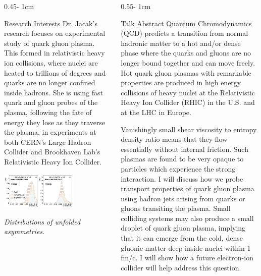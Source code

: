 \documentclass{../psuposter}
\begin{document}
\begin{frame}
\begin{columns}[t, totalwidth=\textwidth]
\begin{column}{0.45\textwidth - 1cm}
    \begin{block}{Research Interests}
        Dr. Jacak’s research focuses on experimental study of quark gluon plasma. This formed in relativistic heavy ion collisions, where nuclei are heated to trillions of degrees and quarks are no longer confined inside hadrons. She is using fast quark and gluon probes of the plasma, following the fate of energy they lose as they traverse the plasma, in experiments at both CERN’s Large Hadron Collider and Brookhaven Lab’s Relativistic Heavy Ion Collider. 
        \begin{center}
	    	\includegraphics[width=0.65\textwidth]{images/research}    		
	    	
	    	\textit{Distributions of unfolded asymmetries.} 
	    	\cite{acharyaTransverseMomentumDependent2021}
    	\end{center}

    \end{block}
\end{column}
\begin{column}{0.55\textwidth - 1cm}


    \begin{block}{Talk Abstract}
    	Quantum Chromodynamics (QCD) predicts a transition from normal hadronic matter to a hot and/or dense phase where the quarks and gluons are no longer bound together and can move freely. Hot quark gluon plasmas with remarkable properties are produced in high energy collisions of heavy nuclei at the Relativistic Heavy Ion Collider (RHIC) in the U.S. and at the LHC in Europe.

		Vanishingly small shear viscosity to entropy density ratio means that they flow essentially without internal friction. Such plasmas are found to be very opaque to particles which experience the strong interaction. I will discuss how we probe transport properties of quark gluon plasma using hadron jets arising from quarks or gluons transiting the plasma. Small colliding systems may also produce a small droplet of quark gluon plasma, implying that it can emerge from the cold, dense gluonic matter deep inside nuclei within 1 fm/c. I will show how a future electron-ion collider will help address this question.
    \end{block}



\end{column}
\end{columns}
\end{frame}
\end{document}
